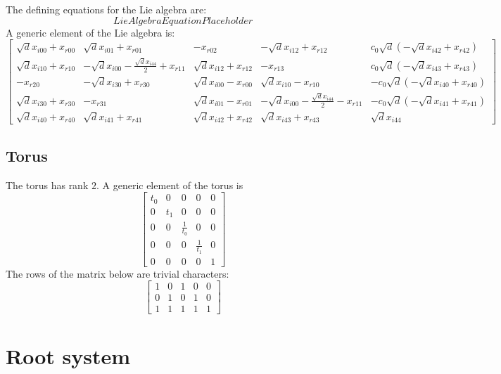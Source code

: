 \documentclass[11pt]{article}
\theoremstyle{definition}
\begin{document}
The defining equations for the Lie algebra are:
\[
LieAlgebraEquationPlaceholder
\]
A generic element of the Lie algebra is:
\[
\left[\begin{matrix}\sqrt{d} x_{i 0 0} + x_{r 0 0} & \sqrt{d} x_{i 0 1} + x_{r 0 1} & - x_{r 0 2} & - \sqrt{d} x_{i 1 2} + x_{r 1 2} & c_{0} \sqrt{d} \left(- \sqrt{d} x_{i 4 2} + x_{r 4 2}\right)\\\sqrt{d} x_{i 1 0} + x_{r 1 0} & - \sqrt{d} x_{i 0 0} - \frac{\sqrt{d} x_{i 4 4}}{2} + x_{r 1 1} & \sqrt{d} x_{i 1 2} + x_{r 1 2} & - x_{r 1 3} & c_{0} \sqrt{d} \left(- \sqrt{d} x_{i 4 3} + x_{r 4 3}\right)\\- x_{r 2 0} & - \sqrt{d} x_{i 3 0} + x_{r 3 0} & \sqrt{d} x_{i 0 0} - x_{r 0 0} & \sqrt{d} x_{i 1 0} - x_{r 1 0} & - c_{0} \sqrt{d} \left(- \sqrt{d} x_{i 4 0} + x_{r 4 0}\right)\\\sqrt{d} x_{i 3 0} + x_{r 3 0} & - x_{r 3 1} & \sqrt{d} x_{i 0 1} - x_{r 0 1} & - \sqrt{d} x_{i 0 0} - \frac{\sqrt{d} x_{i 4 4}}{2} - x_{r 1 1} & - c_{0} \sqrt{d} \left(- \sqrt{d} x_{i 4 1} + x_{r 4 1}\right)\\\sqrt{d} x_{i 4 0} + x_{r 4 0} & \sqrt{d} x_{i 4 1} + x_{r 4 1} & \sqrt{d} x_{i 4 2} + x_{r 4 2} & \sqrt{d} x_{i 4 3} + x_{r 4 3} & \sqrt{d} x_{i 4 4}\end{matrix}\right]
\]

\subsection{Torus}

The torus has rank $2$. A generic element of the torus is
\[
\left[\begin{matrix}t_{0} & 0 & 0 & 0 & 0\\0 & t_{1} & 0 & 0 & 0\\0 & 0 & \frac{1}{t_{0}} & 0 & 0\\0 & 0 & 0 & \frac{1}{t_{1}} & 0\\0 & 0 & 0 & 0 & 1\end{matrix}\right]
\]
The rows of the matrix below are trivial characters:
\[
\left[\begin{matrix}1 & 0 & 1 & 0 & 0\\0 & 1 & 0 & 1 & 0\\1 & 1 & 1 & 1 & 1\end{matrix}\right]
\]

\newpage
\section{Root system}
\end{document}
